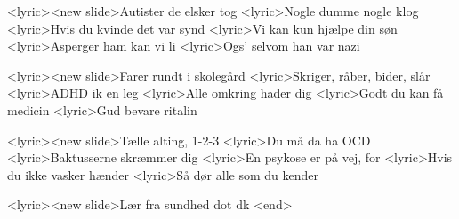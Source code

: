 <lyric><new slide>Autister de elsker tog
<lyric>Nogle dumme nogle klog
<lyric>Hvis du kvinde det var synd
<lyric>Vi kan kun hjælpe din søn
<lyric>Asperger ham kan vi li
<lyric>Ogs’ selvom han var nazi

<lyric><new slide>Farer rundt i skolegård
<lyric>Skriger, råber, bider, slår
<lyric>ADHD ik en leg
<lyric>Alle omkring hader dig
<lyric>Godt du kan få medicin
<lyric>Gud bevare ritalin

<lyric><new slide>Tælle alting, 1-2-3
<lyric>Du må da ha OCD
<lyric>Baktusserne skræmmer dig
<lyric>En psykose er på vej, for 
<lyric>Hvis du ikke vasker hænder
<lyric>Så dør alle som du kender 

<lyric><new slide>Lær fra sundhed dot dk
<end>
